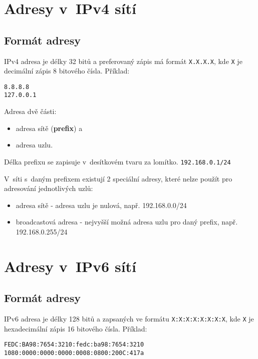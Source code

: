 \section{Adresy v~IPv4 sítí}\label{adresy_ipv4}

\subsection{Formát adresy}
IPv4 adresa je délky 32 bitů a preferovaný zápis má formát {\tt X.X.X.X}, kde
{\tt X} je decimální zápis 8 bitového čísla. Příklad:\\
\begin{verbatim}
8.8.8.8
127.0.0.1
\end{verbatim}

Adresa dvě části:
\begin{itemize}
    \item adresa sítě ({\bf prefix}) a
    \item adresa uzlu.
\end{itemize}
Délka prefixu se zapisuje v~desítkovém tvaru za lomítko. {\tt 192.168.0.1/24}

V~síti s~daným prefixem existují 2 speciální adresy, které nelze použít pro
adresování jednotlivých uzlů:
\begin{itemize}
    \item adresa sítě - adresa uzlu je nulová, např. 192.168.0.0/24
    \item broadcastová adresa - nejvyšší možná adresa uzlu pro daný prefix,
        např. 192.168.0.255/24
\end{itemize}

\section{Adresy v~IPv6 sítí}\label{adresy_ipv6}

\subsection{Formát adresy}
IPv6 adresa je délky 128 bitů a zapsaných ve formátu {\tt X:X:X:X:X:X:X:X}, kde
{\tt X} je hexadecimální zápis 16 bitového čísla.
Příklad:\\
\begin{verbatim}
FEDC:BA98:7654:3210:fedc:ba98:7654:3210
1080:0000:0000:0000:0008:0800:200C:417a
\end{verbatim}

